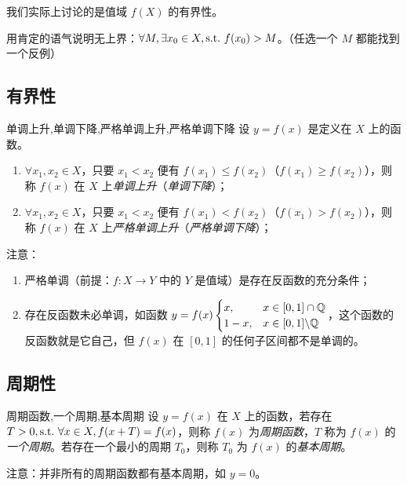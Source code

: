 我们实际上讨论的是值域 $f(X)$ 的有界性。

用肯定的语气说明无上界：$\forall M, \exists x_0 \in X, \text{s.t.~} f(x_0) > M$。（任选一个 $M$ 都能找到一个反例）

\subsection{有界性}

\begin{definition}{单调上升,单调下降,严格单调上升,严格单调下降}
	设 $y = f(x)$ 是定义在 $X$ 上的函数。

	\begin{enumerate}
		\item $\forall x_1, x_2 \in X$，只要 $x_1 < x_2$ 便有 $f(x_1) \le f(x_2)$（$f(x_1) \ge f(x_2)$），则称 $f(x)$ 在 $X$ 上\emph{单调上升}（\emph{单调下降}）；
		\item $\forall x_1, x_2 \in X$，只要 $x_1 < x_2$ 便有 $f(x_1) < f(x_2)$（$f(x_1) > f(x_2)$），则称 $f(x)$ 在 $X$ 上\emph{严格单调上升}（\emph{严格单调下降}）；
	\end{enumerate}
\end{definition}

注意：

\begin{enumerate}
	\item 严格单调（前提：$f: X \rightarrow Y$ 中的 $Y$ 是值域）是存在反函数的充分条件；
	\item 存在反函数未必单调，如函数 $y = f(x) \begin{cases} x, & x \in [0, 1] \cap \mathbb Q \\ 1 - x, & x \in [0, 1] \backslash \mathbb Q \end{cases}$，这个函数的反函数就是它自己，但 $f(x)$ 在 $[0, 1]$ 的任何子区间都不是单调的。
\end{enumerate}

\subsection{周期性}

\begin{definition}{周期函数,一个周期,基本周期}
	设 $y = f(x)$ 在 $X$ 上的函数，若存在 $T > 0, \text{s.t.~} \forall x \in X, f(x + T) = f(x)$，则称 $f(x)$ 为\emph{周期函数}，$T$ 称为 $f(x)$ 的\emph{一个周期}。若存在一个最小的周期 $T_0$，则称 $T_0$ 为 $f(x)$ 的\emph{基本周期}。
\end{definition}

注意：并非所有的周期函数都有基本周期，如 $y = 0$。


